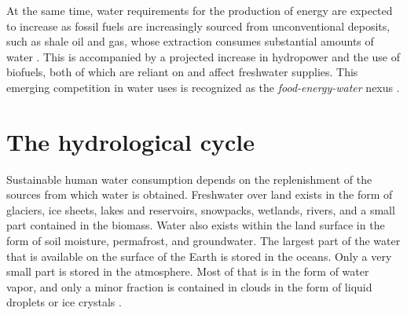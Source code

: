 At the same time, water requirements for the production of energy are expected
to increase as fossil fuels are increasingly sourced from unconventional
deposits, such as shale oil and gas, whose extraction consumes substantial
amounts of water \citep{rosa18}. This is accompanied by a projected increase in
hydropower \citep{zarfl15} and the use of biofuels, both of which are reliant on
and affect freshwater supplies. This emerging competition in water uses is
recognized as the \textit{food-energy-water} nexus \citep{dodorico18}.





%
%


\section{The hydrological cycle}


Sustainable human water consumption depends on the replenishment of the sources
from which water is obtained. Freshwater over land exists in the form of
glaciers, ice sheets, lakes and reservoirs, snowpacks, wetlands, rivers, and a small part contained in the biomass. Water also exists within the land
surface in the form of soil moisture, permafrost, and groundwater. The largest
part of the water that is available on the surface of the Earth is stored in the
oceans. Only a very small part is stored in the atmosphere. Most of that is in
the form of water vapor, and only a minor fraction is contained in clouds in the
form of liquid droplets or ice crystals \citep{abbott19}.

